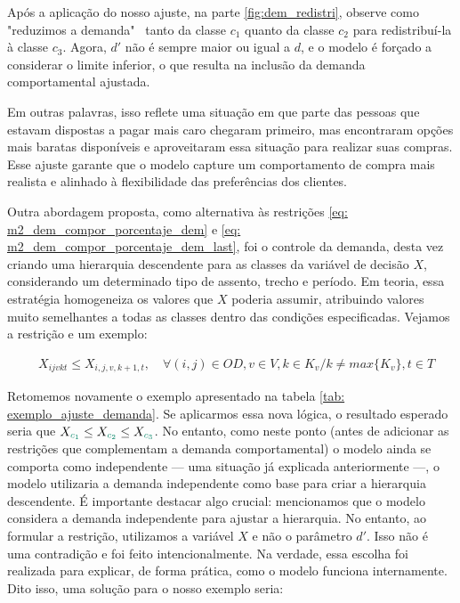Após a aplicação do nosso ajuste, na parte \ref{fig:dem_redistri}, observe como "reduzimos a demanda" \, tanto da classe $c_1$ quanto da classe $c_2$ para redistribuí-la à classe $c_3$. Agora, $d'$ não é sempre maior ou igual a $d$, e o modelo é forçado a considerar o limite inferior, o que resulta na inclusão da demanda comportamental ajustada.

Em outras palavras, isso reflete uma situação em que parte das pessoas que estavam dispostas a pagar mais caro chegaram primeiro, mas encontraram opções mais baratas disponíveis e aproveitaram essa situação para realizar suas compras. Esse ajuste garante que o modelo capture um comportamento de compra mais realista e alinhado à flexibilidade das preferências dos clientes.

Outra abordagem proposta, como alternativa às restrições \ref{eq: m2_dem_compor_porcentaje_dem} e \ref{eq: m2_dem_compor_porcentaje_dem_last}, foi o controle da demanda, desta vez criando uma hierarquia descendente para as classes da variável de decisão $X$, considerando um determinado tipo de assento, trecho e período. Em teoria, essa estratégia homogeneiza os valores que $X$ poderia assumir, atribuindo valores muito semelhantes a todas as classes dentro das condições especificadas. Vejamos a restrição e um exemplo:

\allowdisplaybreaks
\begin{align}
	 & X_{ijvkt} \leq X_{i,j,v,k+1,t}, \quad   \forall(i,j) \in OD, v \in V, k \in K_v / k \neq max\{K_v\}, t \in T  \label{eq: m2_ajuste_hierarquia}
\end{align}

Retomemos novamente o exemplo apresentado na tabela \ref{tab: exemplo_ajuste_demanda}. Se aplicarmos essa nova lógica, o resultado esperado seria que $X_{\textcolor[rgb]{0.0588, 0.5412, 0.4275}{c_1}} \leq X_{\textcolor[rgb]{0.0588, 0.5412, 0.4275}{c_2}} \leq X_{\textcolor[rgb]{0.0588, 0.5412, 0.4275}{c_3}}$. No entanto, como neste ponto (antes de adicionar as restrições que complementam a demanda comportamental) o modelo ainda se comporta como independente — uma situação já explicada anteriormente —, o modelo utilizaria a demanda independente como base para criar a hierarquia descendente. É importante destacar algo crucial: mencionamos que o modelo considera a demanda independente para ajustar a hierarquia. No entanto, ao formular a restrição, utilizamos a variável $X$ e não o parâmetro $d'$. Isso não é uma contradição e foi feito intencionalmente. Na verdade, essa escolha foi realizada para explicar, de forma prática, como o modelo funciona internamente. Dito isso, uma solução para o nosso exemplo seria:

